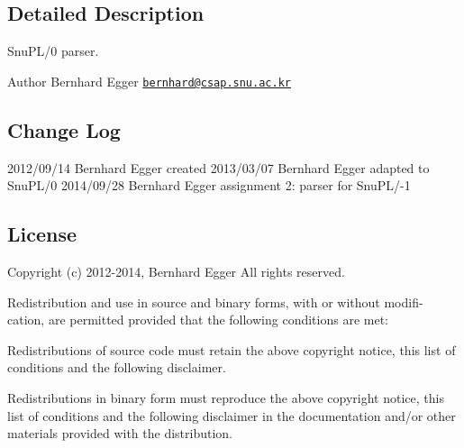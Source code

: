 \subsection{Detailed Description}
Snu\-P\-L/0 parser. 

\begin{DoxyAuthor}{Author}
Bernhard Egger \href{mailto:bernhard@csap.snu.ac.kr}{\tt bernhard@csap.\-snu.\-ac.\-kr} 
\end{DoxyAuthor}
\hypertarget{namespacestd_changelog}{}\subsection{Change Log}\label{namespacestd_changelog}
2012/09/14 Bernhard Egger created 2013/03/07 Bernhard Egger adapted to Snu\-P\-L/0 2014/09/28 Bernhard Egger assignment 2\-: parser for Snu\-P\-L/-\/1\hypertarget{ir_8h_license_section}{}\subsection{License}\label{ir_8h_license_section}
Copyright (c) 2012-\/2014, Bernhard Egger All rights reserved.

Redistribution and use in source and binary forms, with or without modifi-\/ cation, are permitted provided that the following conditions are met\-:


\begin{DoxyItemize}
\item Redistributions of source code must retain the above copyright notice, this list of conditions and the following disclaimer.
\item Redistributions in binary form must reproduce the above copyright notice, this list of conditions and the following disclaimer in the documentation and/or other materials provided with the distribution.
\end{DoxyItemize}

